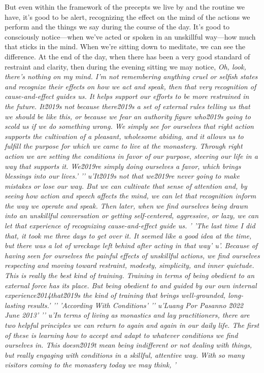 But even within the framework of the precepts we live by and the 
routine we have, it's good to be alert, recognizing the effect on the 
mind of the actions we perform and the things we say during the course 
of the day. It's good to consciously notice---when we've acted or 
spoken in an unskillful way---how much that sticks in the mind. When 
we're sitting down to meditate, we can see the difference. At the end 
of the day, when there has been a very good standard of restraint and 
clarity, then during the evening sitting we may notice, \emph{Oh, look, 
there's nothing on my mind. I'm not remembering anything cruel or 
selfish states and recognize their effects on how we act and speak, then that very recognition of cause-and-effect guides us. It helps support our efforts to be more restrained in the future. It\u2019s not because there\u2019s a set of external rules telling us that we should be like this, or because we fear an authority figure who\u2019s going to scold us if we do something wrong. We simply see for ourselves that right action supports the cultivation of a pleasant, wholesome abiding, and it allows us to fulfill the purpose for which we came to live at the monastery. Through right action we are setting the conditions in favor of our purpose, steering our life in a way that supports it. We\u2019re simply doing ourselves a favor, which brings blessings into our lives.'
'\n'
u'It\u2019s not that we\u2019re never going to make mistakes or lose our way. But we can cultivate that sense of attention and, by seeing how action and speech affects the mind, we can let that recognition inform the way we operate and speak. Then later, when we find ourselves being drawn into an unskillful conversation or getting self-centered, aggressive, or lazy, we can let that experience of recognizing cause-and-effect guide us. '
'The last time I did that, it took me three days to get over it. It seemed like a good idea at the time, but there was a lot of wreckage left behind after acting in that way'
u'. Because of having seen for ourselves the painful effects of unskillful actions, we find ourselves respecting and moving toward restraint, modesty, simplicity, and inner quietude. This is really the best kind of training. Training in terms of being obedient to an external force has its place. But being obedient to and guided by our own internal experience\u2014that\u2019s the kind of training that brings well-grounded, long-lasting results.'
'\n'
'According With Conditions'
'\n'
u'Luang Por Pasanno \u2022 June 2013'
'\n'
u'In terms of living as monastics and lay practitioners, there are two helpful principles we can return to again and again in our daily life. The first of these is learning how to accept and adapt to whatever conditions we find ourselves in. This doesn\u2019t mean being indifferent or not dealing with things, but really engaging with conditions in a skillful, attentive way. With so many visitors coming to the monastery today we may think, '
}
